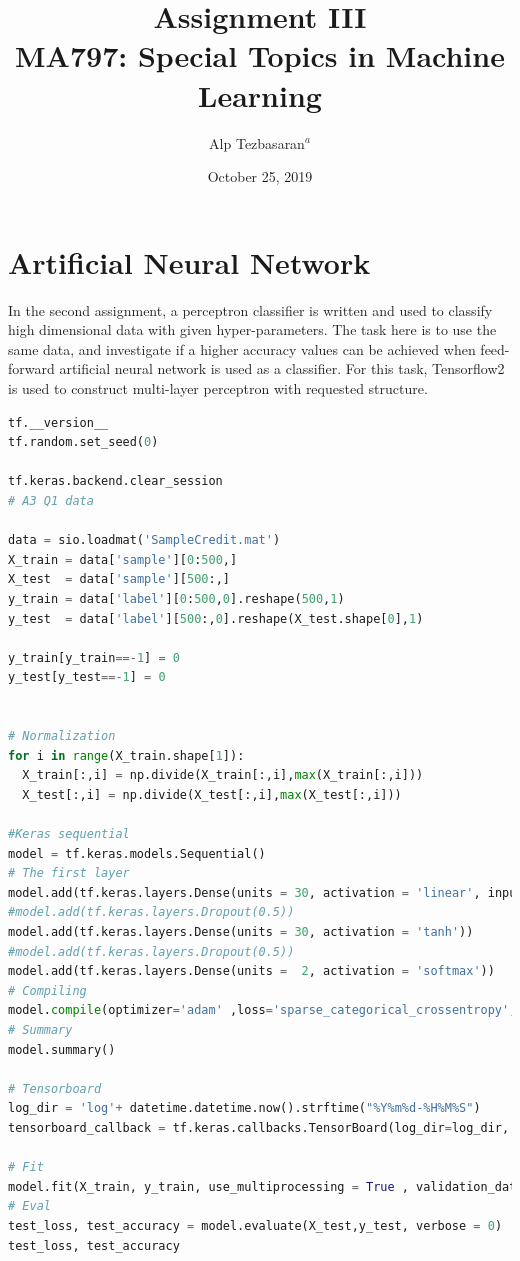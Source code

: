 \documentclass[11pt]{article}
\title{ \bf{Assignment III \\ MA797: Special Topics in Machine Learning}}
\author{Alp Tezbasaran$^{a}$}
\affil{\textit{$^{a}$Department of Nuclear Engineering NCSU, alptezbasaran@ncsu.edu}}
\date{October 25, 2019}
\begin{document}
\maketitle

\section{Artificial Neural Network}

In the second assignment, a perceptron classifier is written and used to classify high dimensional data with given hyper-parameters. The task here is to use the same data, and investigate if a higher accuracy values can be achieved when feed-forward artificial neural network is used as a classifier. For this task, Tensorflow2 is used to construct multi-layer perceptron with requested structure.

\begin{lstlisting}[language=Python, basicstyle=\tiny, caption=Python code for ANN]
tf.__version__
tf.random.set_seed(0)

tf.keras.backend.clear_session
# A3 Q1 data

data = sio.loadmat('SampleCredit.mat')
X_train = data['sample'][0:500,]
X_test  = data['sample'][500:,]
y_train = data['label'][0:500,0].reshape(500,1)
y_test  = data['label'][500:,0].reshape(X_test.shape[0],1)

y_train[y_train==-1] = 0
y_test[y_test==-1] = 0


# Normalization
for i in range(X_train.shape[1]):
  X_train[:,i] = np.divide(X_train[:,i],max(X_train[:,i]))
  X_test[:,i] = np.divide(X_test[:,i],max(X_test[:,i]))

#Keras sequential
model = tf.keras.models.Sequential()
# The first layer
model.add(tf.keras.layers.Dense(units = 30, activation = 'linear', input_shape = (15, )))
#model.add(tf.keras.layers.Dropout(0.5))
model.add(tf.keras.layers.Dense(units = 30, activation = 'tanh'))
#model.add(tf.keras.layers.Dropout(0.5))
model.add(tf.keras.layers.Dense(units =  2, activation = 'softmax'))
# Compiling
model.compile(optimizer='adam' ,loss='sparse_categorical_crossentropy', metrics=['accuracy'])
# Summary
model.summary()

# Tensorboard
log_dir = 'log'+ datetime.datetime.now().strftime("%Y%m%d-%H%M%S")
tensorboard_callback = tf.keras.callbacks.TensorBoard(log_dir=log_dir, histogram_freq=1)

# Fit
model.fit(X_train, y_train, use_multiprocessing = True , validation_data = (X_test, y_test) ,epochs = 1000, callbacks=[tensorboard_callback])
# Eval
test_loss, test_accuracy = model.evaluate(X_test,y_test, verbose = 0)
test_loss, test_accuracy
\end{lstlisting}
\end{document}
